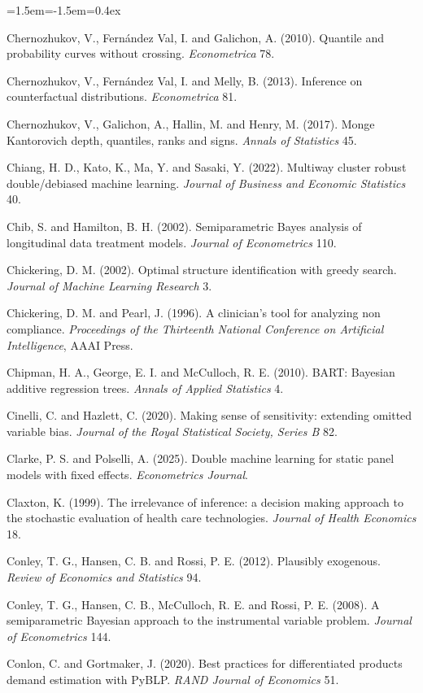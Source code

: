 \begin{list}{}{\leftmargin=1.5em\itemindent=-1.5em\itemsep=0.4ex}
\item Chernozhukov, V., Fern\'andez Val, I. and Galichon, A. (2010). Quantile and probability curves without crossing. \emph{Econometrica} 78.
\item Chernozhukov, V., Fern\'andez Val, I. and Melly, B. (2013). Inference on counterfactual distributions. \emph{Econometrica} 81.
\item Chernozhukov, V., Galichon, A., Hallin, M. and Henry, M. (2017). Monge Kantorovich depth, quantiles, ranks and signs. \emph{Annals of Statistics} 45.
\item Chiang, H. D., Kato, K., Ma, Y. and Sasaki, Y. (2022). Multiway cluster robust double/debiased machine learning. \emph{Journal of Business and Economic Statistics} 40.
\item Chib, S. and Hamilton, B. H. (2002). Semiparametric Bayes analysis of longitudinal data treatment models. \emph{Journal of Econometrics} 110.
\item Chickering, D. M. (2002). Optimal structure identification with greedy search. \emph{Journal of Machine Learning Research} 3.
\item Chickering, D. M. and Pearl, J. (1996). A clinician's tool for analyzing non compliance. \emph{Proceedings of the Thirteenth National Conference on Artificial Intelligence}, AAAI Press.
\item Chipman, H. A., George, E. I. and McCulloch, R. E. (2010). BART: Bayesian additive regression trees. \emph{Annals of Applied Statistics} 4.
\item Cinelli, C. and Hazlett, C. (2020). Making sense of sensitivity: extending omitted variable bias. \emph{Journal of the Royal Statistical Society, Series B} 82.
\item Clarke, P. S. and Polselli, A. (2025). Double machine learning for static panel models with fixed effects. \emph{Econometrics Journal}.
\item Claxton, K. (1999). The irrelevance of inference: a decision making approach to the stochastic evaluation of health care technologies. \emph{Journal of Health Economics} 18.
\item Conley, T. G., Hansen, C. B. and Rossi, P. E. (2012). Plausibly exogenous. \emph{Review of Economics and Statistics} 94.
\item Conley, T. G., Hansen, C. B., McCulloch, R. E. and Rossi, P. E. (2008). A semiparametric Bayesian approach to the instrumental variable problem. \emph{Journal of Econometrics} 144.
\item Conlon, C. and Gortmaker, J. (2020). Best practices for differentiated products demand estimation with PyBLP. \emph{RAND Journal of Economics} 51.

\end{list}
